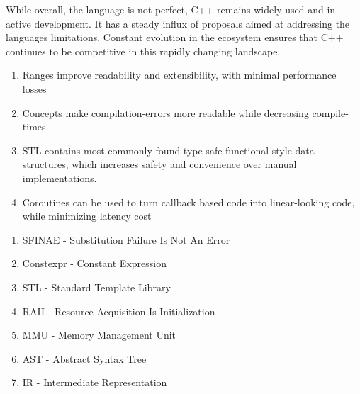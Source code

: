 \documentclass[
    english, %
]{VUMIFPSkursinis}
\begin{document}
While overall, the language is not perfect, C++ remains widely used and in active development. It has a steady influx of proposals aimed at addressing the languages limitations. Constant evolution in the ecosystem ensures that C++ continues to be competitive in this rapidly changing landscape.

\begin{enumerate}[labelindent=0pt]
    \item Ranges improve readability and extensibility, with minimal performance losses
    \item Concepts make compilation-errors more readable while decreasing compile-times
    \item STL contains most commonly found type-safe functional style data structures, which increases safety and convenience over manual implementations.
    \item Coroutines can be used to turn callback based code into linear-looking code, while minimizing latency cost
\end{enumerate}


\printbibliography[heading=bibintoc]  %

\begin{enumerate}
    \item SFINAE - Substitution Failure Is Not An Error
    \item Constexpr - Constant Expression
    \item STL - Standard Template Library
    \item RAII - Resource Acquisition Is Initialization
    \item MMU - Memory Management Unit
    \item AST - Abstract Syntax Tree
    \item IR - Intermediate Representation
\end{enumerate}
\end{document}
